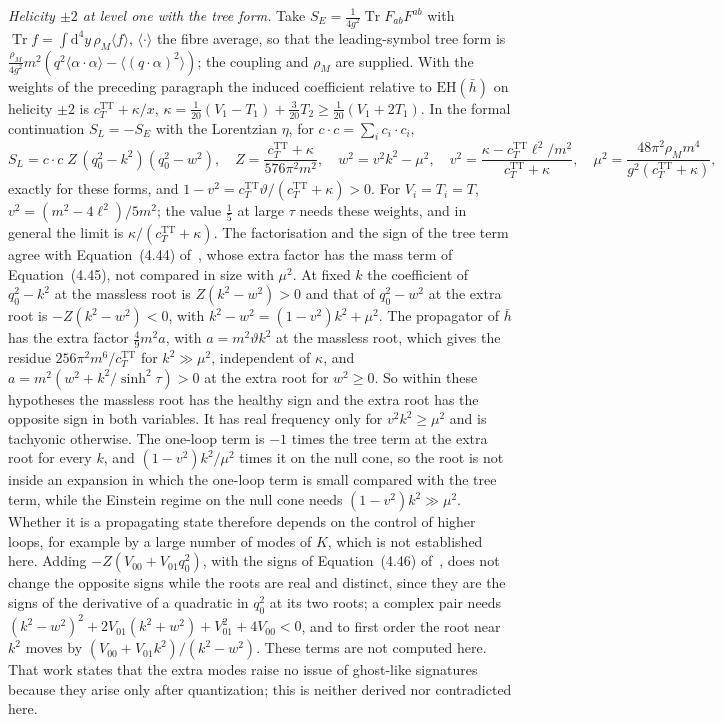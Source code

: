 \emph{Helicity \(\pm2\) at level one with the tree form.} Take \(S_E=\tfrac1{4g^2}\operatorname{Tr}F_{ab}F^{ab}\) with \(\operatorname{Tr}f=\int\mathrm d^4y\,\rho_M\langle f\rangle\), \(\langle\cdot\rangle\) the fibre average, so that the leading-symbol tree form is \(\tfrac{\rho_M}{4g^2}m^2(q^2\langle\alpha\cdot\alpha\rangle-\langle(q\cdot\alpha)^2\rangle)\); the coupling and \(\rho_M\) are supplied. With the weights of the preceding paragraph the induced coefficient relative to \(\mathrm{EH}(\bar h)\) on helicity \(\pm2\) is \(c_T^{\mathrm{TT}}+\kappa/x\), \(\kappa=\tfrac1{20}(V_1-T_1)+\tfrac3{20}T_2\ge\tfrac1{20}(V_1+2T_1)\). In the formal continuation \(S_L=-S_E\) with the Lorentzian \(\eta\), for \(c\cdot c=\sum_ic_i\cdot c_i\),
\[
S_L=c\cdot c\;Z\,(q_0^2-k^2)(q_0^2-w^2),\quad
Z=\frac{c_T^{\mathrm{TT}}+\kappa}{576\pi^2m^2},\quad
w^2=v^2k^2-\mu^2,\quad
v^2=\frac{\kappa-c_T^{\mathrm{TT}}\ell^2/m^2}{c_T^{\mathrm{TT}}+\kappa},\quad
\mu^2=\frac{48\pi^2\rho_Mm^4}{g^2(c_T^{\mathrm{TT}}+\kappa)},
\]
exactly for these forms, and \(1-v^2=c_T^{\mathrm{TT}}\vartheta/(c_T^{\mathrm{TT}}+\kappa)>0\). For \(V_i=T_i=T\), \(v^2=(m^2-4\ell^2)/5m^2\); the value \(\tfrac15\) at large \(\tau\) needs these weights, and in general the limit is \(\kappa/(c_T^{\mathrm{TT}}+\kappa)\). The factorisation and the sign of the tree term agree with Equation~(4.44) of~\cite{Steinacker2026}, whose extra factor has the mass term of Equation~(4.45), not compared in size with \(\mu^2\). At fixed \(k\) the coefficient of \(q_0^2-k^2\) at the massless root is \(Z(k^2-w^2)>0\) and that of \(q_0^2-w^2\) at the extra root is \(-Z(k^2-w^2)<0\), with \(k^2-w^2=(1-v^2)k^2+\mu^2\). The propagator of \(\bar h\) has the extra factor \(\tfrac49m^2a\), with \(a=m^2\vartheta k^2\) at the massless root, which gives the residue \(256\pi^2m^6/c_T^{\mathrm{TT}}\) for \(k^2\gg\mu^2\), independent of \(\kappa\), and \(a=m^2(w^2+k^2/\sinh^2\tau)>0\) at the extra root for \(w^2\ge0\). So within these hypotheses the massless root has the healthy sign and the extra root has the opposite sign in both variables. It has real frequency only for \(v^2k^2\ge\mu^2\) and is tachyonic otherwise. The one-loop term is \(-1\) times the tree term at the extra root for every \(k\), and \((1-v^2)k^2/\mu^2\) times it on the null cone, so the root is not inside an expansion in which the one-loop term is small compared with the tree term, while the Einstein regime on the null cone needs \((1-v^2)k^2\gg\mu^2\). Whether it is a propagating state therefore depends on the control of higher loops, for example by a large number of modes of \(K\), which is not established here. Adding \(-Z(V_{00}+V_{01}q_0^2)\), with the signs of Equation~(4.46) of~\cite{Steinacker2026}, does not change the opposite signs while the roots are real and distinct, since they are the signs of the derivative of a quadratic in \(q_0^2\) at its two roots; a complex pair needs \((k^2-w^2)^2+2V_{01}(k^2+w^2)+V_{01}^2+4V_{00}<0\), and to first order the root near \(k^2\) moves by \((V_{00}+V_{01}k^2)/(k^2-w^2)\). These terms are not computed here. That work states that the extra modes raise no issue of ghost-like signatures because they arise only after quantization; this is neither derived nor contradicted here.

